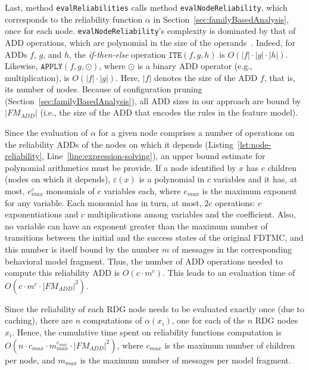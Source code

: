 Last, method  \texttt{evalReliabilities} calls method
\texttt{evalNodeReliability}, which corresponds to the reliability function
$\alpha$ in Section~\ref{sec:familyBasedAnalysis}, once for each node.
\texttt{evalNodeReliability}'s complexity is dominated by that of ADD
operations, which are polynomial in the size of the operands~\cite{Iris1993}.
Indeed, for ADDs $f$, $g$, and $h$, the \emph{if-then-else} operation
$\texttt{ITE}(f, g, h)$ is $O(|f| \cdot |g| \cdot |h|)$.  Likewise,
$\texttt{APPLY}(f, g, \odot)$, where $\odot$ is a binary ADD operator (e.g.,
multiplication), is $O(|f| \cdot |g|)$.  Here, $|f|$ denotes the size of the ADD
$f$, that is, its number of nodes.  Because of configuration pruning
(Section~\ref{sec:familyBasedAnalysis}), all ADD sizes in our approach are
bound by $|\mathit{FM_{ADD}}|$ (i.e., the size of the ADD that encodes the rules
in the feature model).

Since the evaluation of $\alpha$ for a given node comprises a number of
operations on the reliability ADDs of the nodes on which it depends
(Listing~\ref{lst:node-reliability}, Line~\ref{line:expression-solving}), an
upper bound estimate for polynomial arithmetics must be provide.  If a node
identified by $x$ has $c$ children (nodes on which it depends), $\varepsilon(x)$
is a polynomial in $c$ variables and it has, at most, $e_{\mathit{max}}^c$
monomials of $c$ variables each, where $e_{\mathit{max}}$ is the maximum
exponent for any variable.  Each monomial has in turn, at most, $2c$ operations:
$c$ exponentiations and $c$ multiplications among variables and the coefficient.
Also, no variable can have an exponent greater than the maximum number of
transitions between the initial and the success states of the original FDTMC,
and this number is itself bound by the number $m$ of messages in the
corresponding behavioral model fragment.  Thus, the number of ADD operations
needed to compute this reliability ADD is $O(c \cdot m^c)$.  This leads to an
evaluation time of $O(c \cdot m^c \cdot |\mathit{FM_{ADD}}|^2)$.

Since the reliability of each RDG node needs to be evaluated exactly once (due
to caching), there are $n$ computations of $\alpha(x_i)$, one for each of the
$n$ RDG nodes $x_i$. Hence, the cumulative time spent on reliability functions
computation is ${O(n \cdot c_{\mathit{max}} \cdot
m_{\mathit{max}}^{c_{\mathit{max}}} \cdot |\mathit{FM_{ADD}}|^2)}$, where
$c_{\mathit{max}}$ is the maximum number of children per node, and
$m_{\mathit{max}}$ is the maximum number of messages per model fragment.

